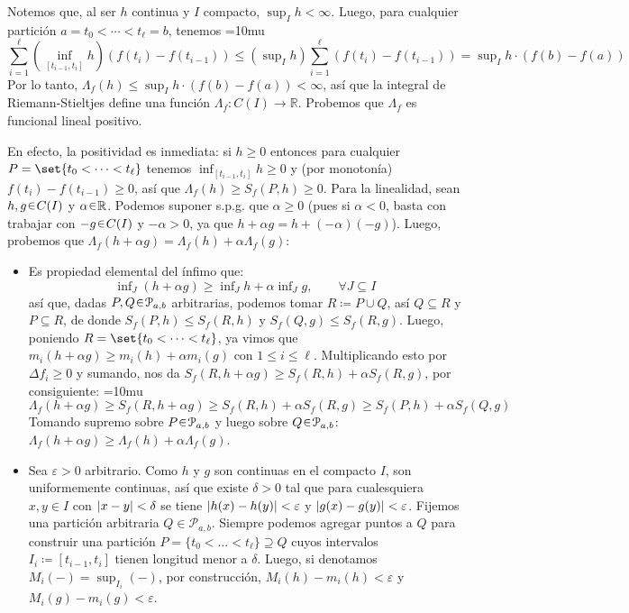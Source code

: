 \begin{sol}
\begin{enumerate}[label=(\roman*),leftmargin=1.8em]
Notemos que, al ser $h$ continua y $I$ compacto, $\sup_I h < \infty$. Luego, para cualquier partición $a=t_0 <\cdots < t_\ell = b$, tenemos
{\thickmuskip=10mu
\[
\sum_{i=1}^\ell \left( \inf_{[t_{i-1}, t_i]} h \right) (f(t_i) - f(t_{i-1}))
\le (\sup\nolimits_I h)\sum_{i=1}^\ell (f(t_i) - f(t_{i-1}))
= {\sup\nolimits_I h} \cdot (f(b)-f(a))
\]
}%
Por lo tanto, $\Lambda_f(h) \le {\sup_Ih} \cdot (f(b)-f(a)) < \infty$, así que la integral de Riemann-Stieltjes define una función $\Lambda_f \colon C(I) \to \mathbb{R}$. Probemos que $\Lambda_f$ es funcional lineal positivo.\par
En efecto, la positividad es inmediata: si $h\ge0$ entonces para cualquier $P=\set{t_0<\cdots<t_\ell}$ tenemos $\inf_{[t_{i-1},t_i]}h \ge 0$ y (por monotonía) $f(t_i) - f(t_{i-1}) \ge 0$, así que $\Lambda_f(h)\ge S_f(P,h) \ge0$.
Para la linealidad, sean $h,g\en C(I)$ y $\alpha\en\mathbb{R}$. Podemos suponer s.p.g. que $\alpha\ge0$ (pues si $\alpha<0$, basta con trabajar con $-g\en C(I)$ y $-\alpha>0$, ya que $h+\alpha g = h + (-\alpha)(-g)$). Luego, probemos que $\Lambda_f(h+\alpha g) = \Lambda_f(h) + \alpha\Lambda_f(g)$:
\begin{itemize}[leftmargin=1.8em]
\item[($\ge$)] 
Es propiedad elemental del ínfimo que:
\[
\inf\nolimits_{J}(h+\alpha g)
\ge
\inf\nolimits_{J}h
+
\alpha\inf\nolimits_{J}g,
\qquad \forall J \subseteq I
\]
así que, dadas $P,Q\en\mathcal{P}_{a,b}$ arbitrarias, podemos tomar $R \coloneq P \cup Q$, así $Q\subseteq R$ y $P\subseteq R$, de donde $S_f(P,h) \leq S_f(R,h)$ y  $S_f(Q,g) \leq S_f(R,g)$. Luego, poniendo $R = \set{t_0<\cdots<t_\ell}$, ya vimos que $m_i(h+\alpha g) \ge m_i(h) + \alpha m_i(g)$ con $1\le i \le \ell$. Multiplicando esto por $\Delta f_i \ge 0$ y sumando, nos da $S_f(R,h+\alpha g) \ge S_f(R,h) + \alpha S_f(R,g)$, por consiguiente:
{\thickmuskip=10mu\mathsurround=0pt%
\[
\Lambda_f(h+\alpha g)
\ge S_f(R,h+\alpha g)
\ge S_f(R,h) + \alpha S_f(R,g)
\ge S_f(P,h) + \alpha S_f(Q,g)
\]
}%
Tomando supremo sobre $P\en\mathcal{P}_{a,b}$ y luego sobre $Q\en\mathcal{P}_{a,b}$: $\Lambda_f(h+\alpha g)\ge\Lambda_f(h)+\alpha\Lambda_f(g)$.
\item[($\le$)] 
Sea $\varepsilon>0$ arbitrario. Como $h$ y $g$ son continuas en el compacto $I$, son uniformemente continuas, así que existe $\delta>0$ tal que para cualesquiera $x,y\in I$ con $\abs{x-y}<\delta$ se tiene $\abs{h(x)-h(y)}<\varepsilon$ y $\abs{g(x)-g(y)}<\varepsilon$.
Fijemos una partición arbitraria $Q\in\mathcal{P}_{a,b}$. Siempre podemos agregar puntos a $Q$ para construir una partición $P=\{t_0<\dots<t_\ell\} \supseteq Q$ cuyos intervalos $I_i\coloneq[t_{i-1},t_i]$ tienen longitud menor a $\delta$. Luego, si denotamos $M_i(-)=\sup_{I_i}(-)$, por construcción, $M_i(h)-m_i(h)<\varepsilon$ y $M_i(g)-m_i(g)<\varepsilon$.


\end{itemize}
\end{enumerate}
\end{sol}
